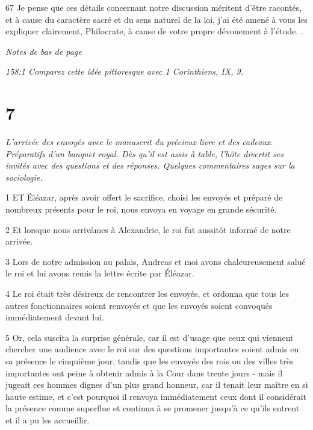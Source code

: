 \par 67 Je pense que ces détails concernant notre discussion méritent d'être racontés, et à cause du caractère sacré et du sens naturel de la loi, j'ai été amené à vous les expliquer clairement, Philocrate, à cause de votre propre dévouement à l'étude. .

\par \textit{Notes de bas de page}

\par \textit{158:1 Comparez cette idée pittoresque avec 1 Corinthiens, IX, 9.}

\chapter{7}

\par \textit{L'arrivée des envoyés avec le manuscrit du précieux livre et des cadeaux. Préparatifs d'un banquet royal. Dès qu'il est assis à table, l'hôte divertit ses invités avec des questions et des réponses. Quelques commentaires sages sur la sociologie.}

\par 1 ET Éléazar, après avoir offert le sacrifice, choisi les envoyés et préparé de nombreux présents pour le roi, nous envoya en voyage en grande sécurité.

\par 2 Et lorsque nous arrivâmes à Alexandrie, le roi fut aussitôt informé de notre arrivée.

\par 3 Lors de notre admission au palais, Andreas et moi avons chaleureusement salué le roi et lui avons remis la lettre écrite par Éléazar.

\par 4 Le roi était très désireux de rencontrer les envoyés, et ordonna que tous les autres fonctionnaires soient renvoyés et que les envoyés soient convoqués immédiatement devant lui.

\par 5 Or, cela suscita la surprise générale, car il est d'usage que ceux qui viennent chercher une audience avec le roi sur des questions importantes soient admis en sa présence le cinquième jour, tandis que les envoyés des rois ou des villes très importantes ont peine à obtenir admis à la Cour dans trente jours - mais il jugeait ces hommes dignes d'un plus grand honneur, car il tenait leur maître en si haute estime, et c'est pourquoi il renvoya immédiatement ceux dont il considérait la présence comme superflue et continua à se promener jusqu'à ce qu'ils entrent et il a pu les accueillir.

